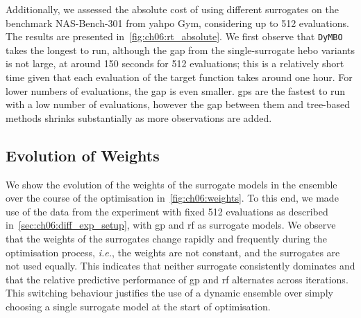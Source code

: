 Additionally, we assessed the absolute cost of using different surrogates on the benchmark NAS-Bench-301 from \gls{yahpo} Gym, considering up to 512 evaluations. The results are presented in~\cref{fig:ch06:rt_absolute}.
We first observe that \texttt{DyMBO}
takes the longest to run, although the gap from the single-surrogate \gls{hebo} variants is not large, at around 150 seconds for 512 evaluations; this is a relatively short time given that each evaluation of the target function takes around one hour. For lower numbers of evaluations, the gap is even smaller.
\glspl{gp} are the fastest to run with a low number of evaluations, however the gap between them and tree-based methods shrinks substantially as more observations are added.

\subsection{Evolution of Weights}
\label{sec:ch06:weights}

We show the evolution of the weights of the surrogate models in the ensemble over the course of the optimisation in~\cref{fig:ch06:weights}.
To this end, we made use of the data from the experiment with fixed 512 evaluations as described in~\cref{sec:ch06:diff_exp_setup}, with \gls{gp} and \gls{rf} as surrogate models.
We observe that the weights of the surrogates change rapidly and frequently during the optimisation process, \emph{i.e.}, the weights are not constant, and the surrogates are not used equally.
This indicates that neither surrogate consistently dominates
and that the relative predictive performance of \gls{gp} and \gls{rf} alternates across iterations.
This switching behaviour justifies the use of a dynamic ensemble over simply choosing a single surrogate model at the start of optimisation.

